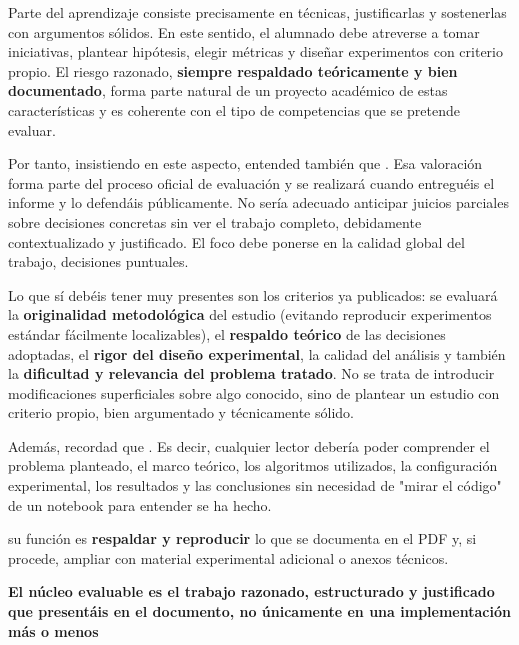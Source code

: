 \documentclass[a4paper, 11pt]{article}
\begin{document}
Parte del aprendizaje consiste precisamente en  técnicas, justificarlas y sostenerlas con argumentos sólidos.
En este sentido, el alumnado debe atreverse a tomar iniciativas, plantear hipótesis, elegir métricas y diseñar experimentos con criterio propio. El riesgo razonado, \textbf{siempre respaldado teóricamente y bien documentado}, forma parte natural de un proyecto académico de estas características y es coherente con el tipo de competencias que se pretende evaluar.

Por tanto, insistiendo en este aspecto, entended también que . Esa valoración forma parte del proceso oficial de evaluación y se realizará cuando entreguéis el informe y lo defendáis públicamente. No sería adecuado anticipar juicios parciales sobre decisiones concretas sin ver el trabajo completo, debidamente contextualizado y justificado. El foco debe ponerse en la calidad global del trabajo,  decisiones puntuales.


Lo que sí debéis tener muy presentes son los criterios ya publicados: se evaluará la \textbf{originalidad metodológica} del estudio (evitando reproducir experimentos estándar fácilmente localizables), el \textbf{respaldo teórico} de las decisiones adoptadas, el \textbf{rigor del diseño experimental}, la calidad del análisis y también la \textbf{dificultad y relevancia del problema tratado}. No se trata de introducir modificaciones superficiales sobre algo conocido, sino de plantear un estudio con criterio propio, bien argumentado y técnicamente sólido.

Además, recordad que . Es decir, cualquier lector debería poder comprender el problema planteado, el marco teórico, los algoritmos utilizados, la configuración experimental, los resultados y las conclusiones sin necesidad de "{}mirar el código"{} de un notebook para entender se ha hecho. 

 su función es \textbf{respaldar y reproducir} lo que se documenta en el PDF y, si procede, ampliar con material experimental adicional o anexos técnicos. 

\textbf{El núcleo evaluable es el trabajo razonado, estructurado y justificado que presentáis en el documento, no únicamente en una implementación más o menos}  
\end{document}
